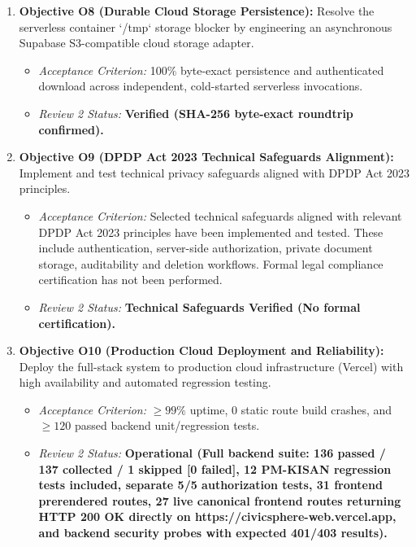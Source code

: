 \begin{enumerate}
    \item \textbf{Objective O8 (Durable Cloud Storage Persistence):} Resolve the serverless container `/tmp` storage blocker by engineering an asynchronous Supabase S3-compatible cloud storage adapter.
    \begin{itemize}
        \item \textit{Acceptance Criterion:} 100\% byte-exact persistence and authenticated download across independent, cold-started serverless invocations.
        \item \textit{Review 2 Status:} \textbf{Verified (SHA-256 byte-exact roundtrip confirmed).}
    \end{itemize}

    \item \textbf{Objective O9 (DPDP Act 2023 Technical Safeguards Alignment):} Implement and test technical privacy safeguards aligned with DPDP Act 2023 principles.
    \begin{itemize}
        \item \textit{Acceptance Criterion:} Selected technical safeguards aligned with relevant DPDP Act 2023 principles have been implemented and tested. These include authentication, server-side authorization, private document storage, auditability and deletion workflows. Formal legal compliance certification has not been performed.
        \item \textit{Review 2 Status:} \textbf{Technical Safeguards Verified (No formal certification).}
    \end{itemize}

    \item \textbf{Objective O10 (Production Cloud Deployment and Reliability):} Deploy the full-stack system to production cloud infrastructure (Vercel) with high availability and automated regression testing.
    \begin{itemize}
        \item \textit{Acceptance Criterion:} $\ge 99\%$ uptime, 0 static route build crashes, and $\ge 120$ passed backend unit/regression tests.
        \item \textit{Review 2 Status:} \textbf{Operational (Full backend suite: 136 passed / 137 collected / 1 skipped [0 failed], 12 PM-KISAN regression tests included, separate 5/5 authorization tests, 31 frontend prerendered routes, 27 live canonical frontend routes returning HTTP 200 OK directly on https://civicsphere-web.vercel.app, and backend security probes with expected 401/403 results).}
    \end{itemize}
\end{enumerate}

